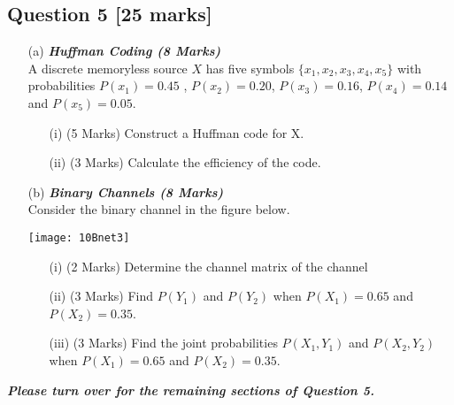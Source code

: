 \documentclass[a4paper,12pt]{article}
\begin{document}
\subsection*{Question 5 [25 marks] }
\begin{itemize}
\item[(a)] \textbf{\textit{Huffman Coding (8 Marks)}}\\
A discrete memoryless source $X$ has five symbols $\{x_1,x_2,x_3,x_4,x_5\}$ with probabilities $P(x_1) = 0.45$ , $P(x_2) = 0.20$, $P(x_3) = 0.16$, $P(x_4) = 0.14$ and $P(x_5) = 0.05$.

\begin{itemize}
\item[(i)] (5 Marks) Construct a Huffman code for X.
\item[(ii)] (3 Marks) Calculate the efficiency of the code.
\end{itemize}
\bigskip
\item[(b)] \textbf{\textit{Binary Channels (8 Marks)}}\\
Consider the binary channel in the figure below.
\begin{center}
\texttt{[image: 10Bnet3]}
\end{center}

\begin{itemize}
\item[(i)] (2 Marks) Determine the channel matrix of the channel
\item[(ii)] (3 Marks) Find $P(Y_1)$ and $P(Y_2)$ when $P(X_1) = 0.65$ and $P(X_2) = 0.35$.
\item[(iii)] (3 Marks) Find the joint probabilities $P(X_1,Y_1)$ and $P(X_2,Y_2)$ when $P(X_1) = 0.65$ and $P(X_2) = 0.35$.
\end{itemize}
\end{itemize}

{
\normalsize
\textit{\textbf{Please turn over for the remaining sections of Question 5.}}
}
\end{document}
